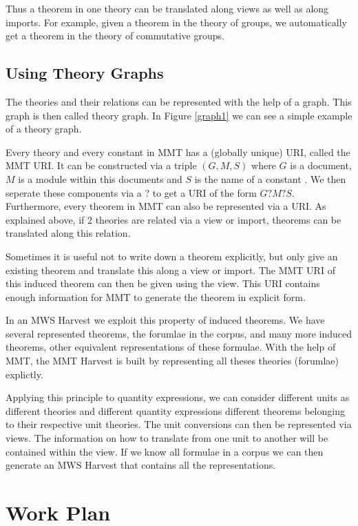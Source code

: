 \documentclass[11pt]{article}
\begin{document}
Thus a theorem in one theory can be translated along views as well as along imports. For example, given a theorem in the theory of groups, we automatically get a theorem in the theory of commutative groups.

\subsection{Using Theory Graphs}
\label{sec:mws:tg}

The theories and their relations can be represented with the help of a graph. This graph is then called theory graph. In Figure \ref{graph1} we can see a simple example of a theory graph.



Every theory and every constant in MMT has a (globally unique) URI, called the MMT URI. It can be constructed via a triple $\left( G,M,S \right)$ where $G$ is a document, $M$ is a module within this documents and $S$ is the name of a constant \cite{RabKoh:WSMSML13}. We then seperate these components via a ? to get a URI of the form $G?M?S$. Furthermore, every theorem in MMT can also be represented via a URI. As explained above, if 2 theories are related via a view or import, theorems can be translated along this relation.

Sometimes it is useful not to write down a theorem explicitly, but only give an existing theorem and translate this along a view or import. The MMT URI of this induced theorem can then be given using the view. This URI contains enough information for MMT to generate the theorem in explicit form\cite{IanKohProd:rassmk14}.

In an MWS Harvest we exploit this property of induced theorems. We have several represented theorems, the forumlae in the corpus, and many more induced theorems, other equivalent representations of these formulae. With the help of MMT, the MMT Harvest is built by representing all theses theories (forumlae) explictly.

Applying this principle to quantity expressions, we can consider different units as different theories and different quantity expressions different theorems belonging to their respective unit theories. The unit conversions can then be represented via views. The information on how to translate from one unit to another will be contained within the view. If we know all formulae in a corpus we can then generate an MWS Harvest that contains all the representations.

\section{Work Plan}
\label{sec:timings}
\end{document}
